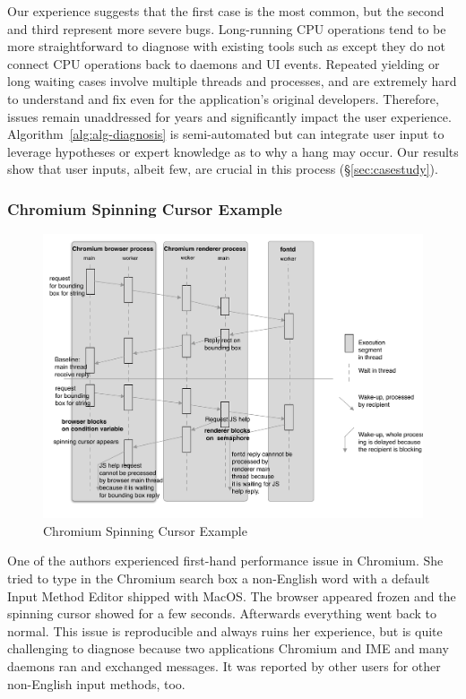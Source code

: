 \noindent
Our experience suggests that the first case is the most common, but the
second and third represent more severe bugs. Long-running CPU operations tend to
be more straightforward to diagnose with existing tools such as \spindump except
they do not connect CPU operations back to daemons and UI events. Repeated yielding or
long waiting cases involve multiple threads and processes, and are extremely
hard to understand and fix even for the application's original developers.
Therefore, issues remain unaddressed for years and significantly impact the
user experience. Algorithm~\ref{alg:alg-diagnosis} is semi-automated but can
integrate user input to leverage hypotheses or expert knowledge
as to why a hang may occur. Our results show that user inputs, albeit few, are
crucial in this process (\S\ref{sec:casestudy}).

\subsubsection{Chromium Spinning Cursor Example}

\begin{figure}[tb]
	\footnotesize
    \centering
	\includegraphics[width=\columnwidth]{./figures/chromium_case_study_2.pdf}
    \caption{Chromium Spinning Cursor Example}
    \label{fig:chromium-case-study}
\end{figure}

One of the authors experienced first-hand performance issue
in Chromium. She tried to type in
the Chromium search box a non-English word with a default Input Method Editor
shipped with MacOS. The browser appeared frozen and the spinning cursor showed
for a few seconds. Afterwards everything went back to normal. This issue is
reproducible and always ruins her experience, but is quite challenging to
diagnose because two applications Chromium and IME and many daemons ran and
exchanged messages. It was reported by other users for other non-English input
methods, too.

